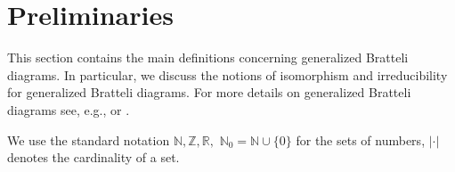 \documentclass[11pt, twoside]{amsart}
\theoremstyle{definition}
\theoremstyle{remark}
\theoremstyle{plain}
\newcommand{\N}{\mathbb N}
\newcommand{\Z}{\mathbb Z}
\newcommand{\R}{{\mathbb R}}
\numberwithin{equation}{section}
\begin{document}

\section{Preliminaries}\label{sec:prelim}

This section contains the main definitions concerning generalized Bratteli diagrams.  
In particular, we discuss the notions of isomorphism and irreducibility for generalized Bratteli diagrams. For more details on generalized Bratteli diagrams see, e.g., \cite{BezuglyiJorgensenKarpelSanadhya2025} or \cite{BezuglyiKarpelKwiatkowskiWata2024}.

We use the standard notation $\mathbb N, \Z, \R,$  
$\mathbb{N}_0 = \N \cup \{0\}$ for the sets of numbers, 
$|\cdot |$ denotes the cardinality of a set.

\end{document}
